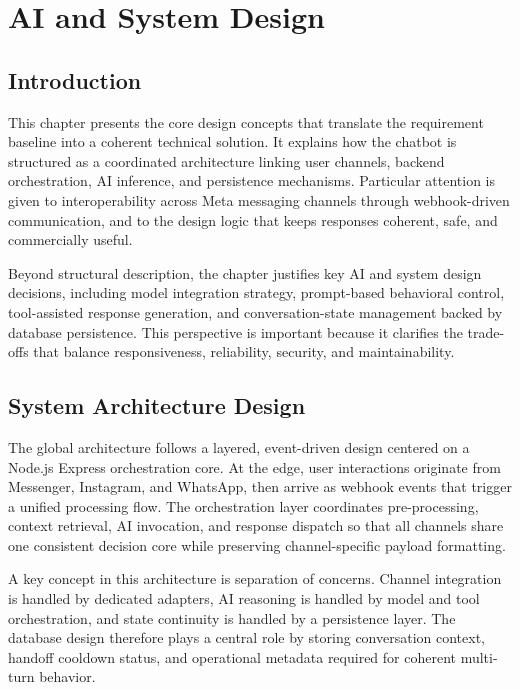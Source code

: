 \fancyhf{}
\setlength{\headheight}{14.49998pt}
\lhead{\textsl{\footnotesize{\nouppercase{\rightmark}}}}
\rhead{\textsl{\footnotesize{\nouppercase{\leftmark}}}}

\cfoot{\thepage}
\rfoot{\textsl{\footnotesize}}

\chapter{AI and System Design}

\section{Introduction}
This chapter presents the core design concepts that translate the requirement baseline into a coherent technical solution. It explains how the chatbot is structured as a coordinated architecture linking user channels, backend orchestration, AI inference, and persistence mechanisms. Particular attention is given to interoperability across Meta messaging channels through webhook-driven communication, and to the design logic that keeps responses coherent, safe, and commercially useful.

Beyond structural description, the chapter justifies key AI and system design decisions, including model integration strategy, prompt-based behavioral control\cite{liu2023prompting_survey}, tool-assisted response generation, and conversation-state management backed by database persistence. This perspective is important because it clarifies the trade-offs that balance responsiveness, reliability, security, and maintainability.

\section{System Architecture Design}
The global architecture follows a layered, event-driven design centered on a Node.js\cite{nodejs_docs} Express\cite{express_docs} orchestration core. At the edge, user interactions originate from Messenger, Instagram, and WhatsApp, then arrive as webhook events that trigger a unified processing flow\cite{meta_webhooks_docs}. The orchestration layer coordinates pre-processing, context retrieval, AI invocation, and response dispatch so that all channels share one consistent decision core while preserving channel-specific payload formatting.

A key concept in this architecture is separation of concerns. Channel integration is handled by dedicated adapters, AI reasoning is handled by model and tool orchestration, and state continuity is handled by a persistence layer. The database design therefore plays a central role by storing conversation context, handoff cooldown status, and operational metadata required for coherent multi-turn behavior.

